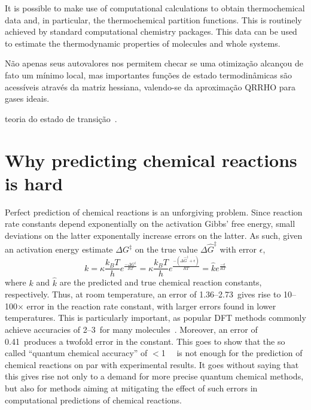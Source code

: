 It is possible to make use of computational calculations to obtain
thermochemical data and, in particular, the thermochemical partition
functions.
This is routinely achieved by standard computational chemistry packages.
This data can be used to estimate the thermodynamic properties of molecules and
whole systems.

Não apenas seus autovalores nos permitem checar se uma otimização alcançou de fato um mínimo local, mas importantes funções de estado termodinâmicas são acessíveis através da matriz hessiana, valendo-se da aproximação QRRHO para gases ideais.

teoria do estado de transição~\cite{TransitionStateTheory}. %

\section{Why predicting chemical reactions is hard}

Perfect prediction of chemical reactions is an unforgiving problem.
Since reaction rate constants depend exponentially on the activation Gibbs' free energy,
small deviations on the latter exponentally increase errors on the latter.
As such, given an activation energy estimate $\Delta G^\ddagger$
on the true value $\Delta \widehat{G}^\ddagger$
with error $\epsilon$,
%
\begin{equation}
	k = \kappa \frac{k_B T}{h} e^\frac{- \Delta G^\ddagger}{R T}
	= \kappa \frac{k_B T}{h} e^\frac{- \left(\Delta \widehat{G}^\ddagger + \epsilon\right)}{R T}
	= \widehat{k} e^\frac{- \epsilon}{R T}
\end{equation}
%
where $k$ and $\widehat{k}$ are the predicted and true chemical reaction constants, respectively.
Thus, at room temperature, an error of 1.36--2.73~\kcalmol gives rise to 10--100$\times$ error
in the reaction rate constant, with larger errors found in lower temperatures.
This is particularly important, as popular DFT methods commonly achieve accuracies of
2--3~\kcalmol for many molecules~\cite{Becke_2014,Bogojeski_2020}.
Moreover, an error of 0.41~\kcalmol produces a twofold error in the constant.
This goes to show that the so called ``quantum chemical accuracy'' of
$<$1~\kcalmol~\cite{Bogojeski_2020}
is not enough for the prediction of chemical reactions on par with experimental results.
It goes without saying that this gives rise not only to a demand
for more precise quantum chemical methods,
but also for methods aiming at mitigating the effect of such errors
in computational predictions of chemical reactions.

